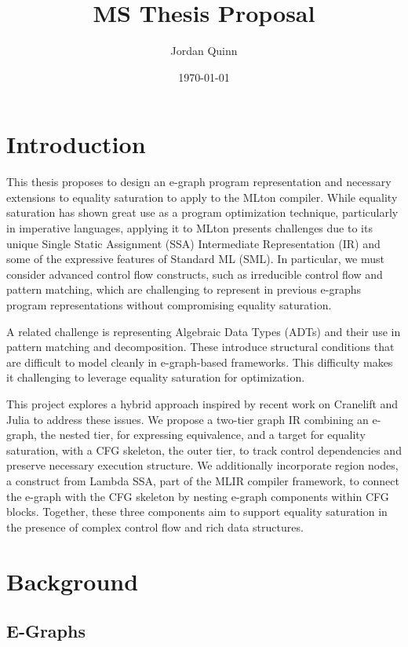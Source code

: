 \documentclass{article}
\title{MS Thesis Proposal}
\author{Jordan Quinn}
\date{\today}
\begin{document}
\maketitle

\section{Introduction}

This thesis proposes to design an e-graph program representation and necessary extensions to equality saturation to apply to the MLton compiler. While equality saturation has shown great use as a program optimization technique, particularly in imperative languages, applying it to MLton presents challenges due to its unique Single Static Assignment (SSA) Intermediate Representation (IR) and some of the expressive features of Standard ML (SML). In particular, we must consider advanced control flow constructs, such as irreducible control flow and pattern matching, which are challenging to represent in previous e-graphs program representations without compromising equality saturation.

A related challenge is representing Algebraic Data Types (ADTs) and their use in pattern matching and decomposition. These introduce structural conditions that are difficult to model cleanly in e-graph-based frameworks. This difficulty makes it challenging to leverage equality saturation for optimization.

This project explores a hybrid approach inspired by recent work on Cranelift and Julia to address these issues. We propose a two-tier graph IR combining an e-graph, the nested tier, for expressing equivalence, and a target for equality saturation,  with a CFG skeleton, the outer tier, to track control dependencies and preserve necessary execution structure. We additionally incorporate region nodes, a construct from Lambda SSA, part of the MLIR compiler framework, to connect the e-graph with the CFG skeleton by nesting e-graph components within CFG blocks. Together, these three components aim to support equality saturation in the presence of complex control flow and rich data structures.



\section{Background}

\subsection{E-Graphs}
\end{document}
